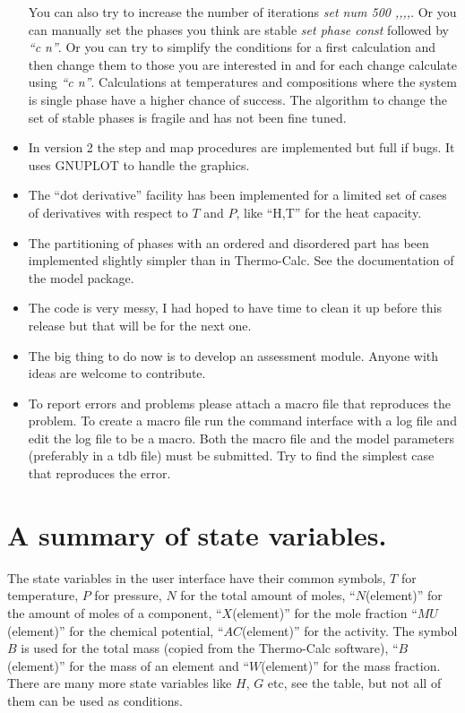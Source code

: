 \documentclass[12pt]{article}
\begin{document}
\begin{itemize}
  You can also try to increase the number of iterations {\em set num
    500 ,,,,}.  Or you can manually set the phases you think are
  stable {\em set phase const} followed by {\em ``c n''}.  Or you can
  try to simplify the conditions for a first calculation and then
  change them to those you are interested in and for each change
  calculate using {\em ``c n''}.  Calculations at temperatures and
  compositions where the system is single phase have a higher chance
  of success.  The algorithm to change the set of stable phases is
  fragile and has not been fine tuned.

\item In version 2 the step and map procedures are implemented but
  full if bugs.  It uses GNUPLOT to handle the graphics.  

\item The ``dot derivative'' facility has been implemented for a
  limited set of cases of derivatives with respect to $T$ and $P$,
  like ``H,T'' for the heat capacity.  

\item The partitioning of phases with an ordered and disordered part
  has been implemented slightly simpler than in Thermo-Calc.  See the
  documentation of the model package.

\item The code is very messy, I had hoped to have time to clean it up
  before this release but that will be for the next one.

\item The big thing to do now is to develop an assessment module.
  Anyone with ideas are welcome to contribute.

\item To report errors and problems please attach a macro file that
  reproduces the problem.  To create a macro file run the command
  interface with a log file and edit the log file to be a macro.  Both
  the macro file and the model parameters (preferably in a tdb file)
  must be submitted.  Try to find the simplest case that reproduces
  the error.

\end{itemize}

\section{A summary of state variables.}

The state variables in the user interface have their common symbols,
$T$ for temperature, $P$ for pressure, $N$ for the total amount of
moles, ``$N$(element)'' for the amount of moles of a component,
``$X$(element)'' for the mole fraction ``$MU$(element)'' for the
chemical potential, ``$AC$(element)'' for the activity.  The symbol
$B$ is used for the total mass (copied from the Thermo-Calc software),
``$B$(element)'' for the mass of an element and ``$W$(element)'' for
the mass fraction.  There are many more state variables like $H$, $G$
etc, see the table, but not all of them can be used as conditions.
\end{document}
